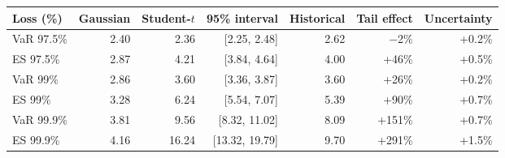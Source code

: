 \begin{tabular}{lrrrrrr}
\toprule
Loss (\%) & Gaussian & Student-$t$ & 95\% interval & Historical & Tail effect & Uncertainty \\
\midrule
VaR 97.5\% & 2.40 & 2.36 & [2.25, 2.48] & 2.62 & $-$2\% & +0.2\% \\
ES 97.5\% & 2.87 & 4.21 & [3.84, 4.64] & 4.00 & +46\% & +0.5\% \\
VaR 99\% & 2.86 & 3.60 & [3.36, 3.87] & 3.60 & +26\% & +0.2\% \\
ES 99\% & 3.28 & 6.24 & [5.54, 7.07] & 5.39 & +90\% & +0.7\% \\
VaR 99.9\% & 3.81 & 9.56 & [8.32, 11.02] & 8.09 & +151\% & +0.7\% \\
ES 99.9\% & 4.16 & 16.24 & [13.32, 19.79] & 9.70 & +291\% & +1.5\% \\
\bottomrule
\end{tabular}
